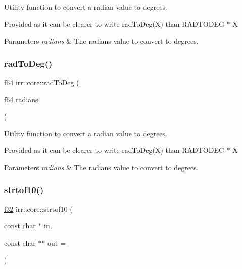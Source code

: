 Utility function to convert a radian value to degrees. 

Provided as it can be clearer to write rad\+To\+Deg(\+X) than R\+A\+D\+T\+O\+D\+EG $\ast$ X 
\begin{DoxyParams}{Parameters}
{\em radians} & The radians value to convert to degrees. \\
\hline
\end{DoxyParams}
\mbox{\label{namespaceirr_1_1core_aab39939b1518daee0967c368a3bf924a}} 
\subsubsection{\texorpdfstring{rad\+To\+Deg()}{radToDeg()}\hspace{0.1cm}{\footnotesize\ttfamily [2/2]}}
{\footnotesize\ttfamily \hyperlink{namespaceirr_a1325b02603ad449f92c68fc640af9b28}{f64} irr\+::core\+::rad\+To\+Deg (\begin{DoxyParamCaption}\item[{\hyperlink{namespaceirr_a1325b02603ad449f92c68fc640af9b28}{f64}}]{radians }\end{DoxyParamCaption})\hspace{0.3cm}{\ttfamily [inline]}}



Utility function to convert a radian value to degrees. 

Provided as it can be clearer to write rad\+To\+Deg(\+X) than R\+A\+D\+T\+O\+D\+EG $\ast$ X 
\begin{DoxyParams}{Parameters}
{\em radians} & The radians value to convert to degrees. \\
\hline
\end{DoxyParams}
\mbox{\label{namespaceirr_1_1core_a032ec5ae63987749c7b30c18ea4ccd92}} 
\subsubsection{\texorpdfstring{strtof10()}{strtof10()}}
{\footnotesize\ttfamily \hyperlink{namespaceirr_a0277be98d67dc26ff93b1a6a1d086b07}{f32} irr\+::core\+::strtof10 (\begin{DoxyParamCaption}\item[{const char $\ast$}]{in,  }\item[{const char $\ast$$\ast$}]{out = {} }\end{DoxyParamCaption})\hspace{0.3cm}{\ttfamily [inline]}}



